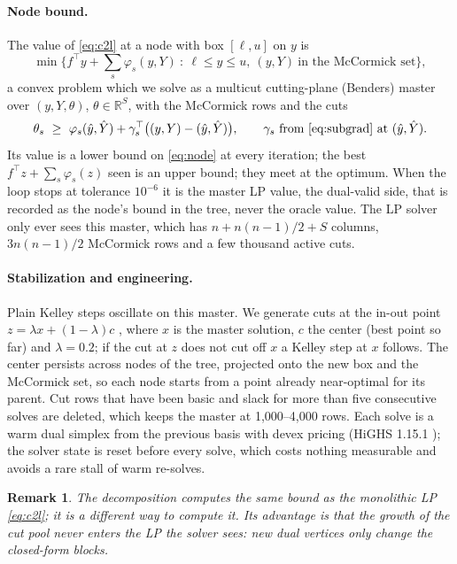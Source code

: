 \documentclass[11pt]{article}
\newtheorem{remark}{Remark}
\newcommand{\T}{^{\top}}
\begin{document}
\paragraph{Node bound.} The value of \eqref{eq:c2l} at a node with box $[\ell,u]$ on $y$ is
\begin{equation}\label{eq:node}
\min\Big\{ f\T y + \sum_s \varphi_s(y,Y)\ :\ \ell\le y\le u,\ (y,Y)\ \text{in the McCormick set}\Big\},
\end{equation}
a convex problem which we solve as a multicut cutting-plane (Benders) master over $(y,Y,\theta)$, $\theta\in\mathbb{R}^S$, with
the McCormick rows and the cuts
\begin{equation}\label{eq:mcut}
\theta_s\ \ge\ \varphi_s(\hat y,\hat Y) + \gamma_s\T\big((y,Y)-(\hat y,\hat Y)\big),\qquad \gamma_s\ \text{from \eqref{eq:subgrad} at } (\hat y,\hat Y).
\end{equation}
Its value is a lower bound on \eqref{eq:node} at every iteration; the best $f\T z + \sum_s\varphi_s(z)$
seen is an upper bound; they meet at the optimum. When the loop stops at tolerance $10^{-6}$ it is the master LP
value, the dual-valid side, that is recorded as the node's bound in the tree, never the oracle value. The LP solver only ever sees this master, which has
$n + n(n-1)/2 + S$ columns, $3n(n-1)/2$ McCormick rows and a few thousand active cuts.

\paragraph{Stabilization and engineering.} Plain Kelley steps oscillate on this master. We generate cuts at the
in-out point $z = \lambda x + (1-\lambda)c$ \cite{benameur}, where $x$ is the master solution, $c$ the center (best
point so far) and $\lambda = 0.2$; if the cut at $z$ does not cut off $x$ a Kelley step at $x$ follows. The center
persists across nodes of the tree, projected onto the new box and the McCormick set, so each node starts from a point
already near-optimal for its parent. Cut rows that have been basic and slack for more than five consecutive solves
are deleted, which keeps the master at 1,000--4,000 rows. Each solve is a warm dual simplex from the previous basis
with devex pricing (HiGHS 1.15.1 \cite{highs}); the solver state is reset before every solve, which costs nothing
measurable and avoids a rare stall of warm re-solves.

\begin{remark}
The decomposition computes the same bound as the monolithic LP \eqref{eq:c2l}; it is a different way to compute it.
Its advantage is that the growth of the cut pool never enters the LP the solver sees: new dual vertices only change
the closed-form blocks.
\end{remark}
\end{document}
